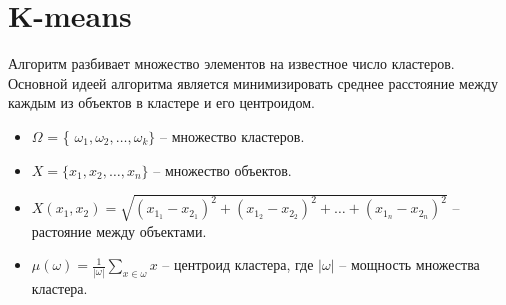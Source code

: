 %

\section*{K-means}
Алгоритм разбивает множество элементов на известное число кластеров. Основной идеей алгоритма является минимизировать среднее расстояние между каждым из объектов в кластере и его центроидом. 

\begin{itemize}

\item \( \varOmega \) = \{ \( \omega_1, \omega_2, \ldots, \omega_k \} \) -- множество кластеров.

\item \( X = \{ x_1, x_2, \ldots , x_n \} \) -- множество объектов. 

\item \( X(x_1, x_2) = \sqrt{(x_{1_1} - x_{2_1})^2 + (x_{1_2} - x_{2_2})^2 + \ldots + (x_{1_n} - x_{2_n})^2 } \) -- растояние между объектами.

\item \( \mu(\omega) = \frac{1}{|\omega|} \sum_{x \in \omega}x \) -- центроид кластера, где \( |\omega| \) -- мощность множества кластера.


\end{itemize}

